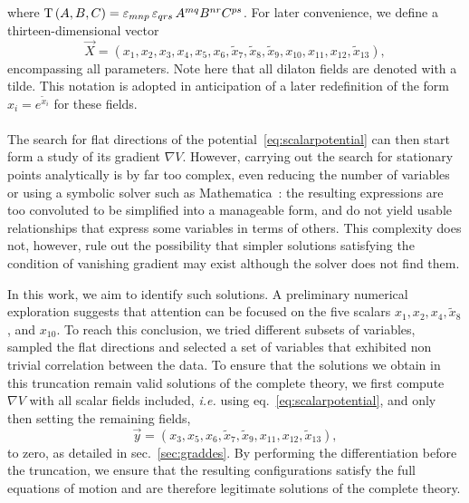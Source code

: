 \documentclass[11pt,a4paper]{article}
\begin{document}
where ${\rm T}\left(A,B,C\right)=\varepsilon_{mnp}\,\varepsilon_{qrs}\,A^{mq}B^{nr}C^{ps}$.
For later convenience, we define a thirteen-dimensional vector
\begin{equation} \label{eq:defvecX}
	\vec{X} = (x_1, x_{2}, x_{3}, x_{4}, x_{5}, x_6, \tilde{x}_7, \tilde{x}_8, \tilde{x}_9,x_{10}, x_{11}, x_{12}, \tilde{x}_{13}),
\end{equation}
encompassing all parameters. Note here that all dilaton fields are denoted with a tilde. This notation is adopted in anticipation of a later redefinition of the form \( x_i = e^{\tilde{x}_i} \) for these fields. %

\paragraph{}
The search for flat directions of the potential~\eqref{eq:scalarpotential} can then start form a study of its gradient $\nabla V$. However, carrying out the search for stationary points analytically is by far too complex, even reducing the number of variables or using a symbolic solver such as Mathematica~\cite{Mathematica}: the resulting expressions are too convoluted to be simplified into a manageable form, and do not yield usable relationships that express some variables in terms of others. This complexity does not, however, rule out the possibility that simpler solutions satisfying the condition of vanishing gradient may exist although the solver does not find them. 

In this work, we aim to identify such solutions. 
A preliminary numerical exploration suggests that attention can be focused on the five scalars $x_{1}, x_{2}, x_{4}, \tilde{x}_{8}$, and $x_{10}$. To reach this conclusion, we tried different subsets of variables, sampled the flat directions and selected a set of variables that exhibited non trivial correlation between the data. To ensure that the solutions we obtain in this truncation remain valid solutions of the complete theory, we first compute $\nabla V$ with all scalar fields included, \textit{i.e.} using eq.~\eqref{eq:scalarpotential}, and only then setting the remaining fields,
\begin{equation} \label{eq:defvecy}
	\vec{y} = (x_3,x_5,x_6,\tilde{x}_7,\tilde{x}_9,x_{11},x_{12},\tilde{x}_{13}),
\end{equation}
to zero, as detailed in sec.~\ref{sec:graddes}. By performing the differentiation before the truncation, we ensure that the resulting configurations satisfy the full equations of motion and are therefore legitimate solutions of the complete theory.
\end{document}

